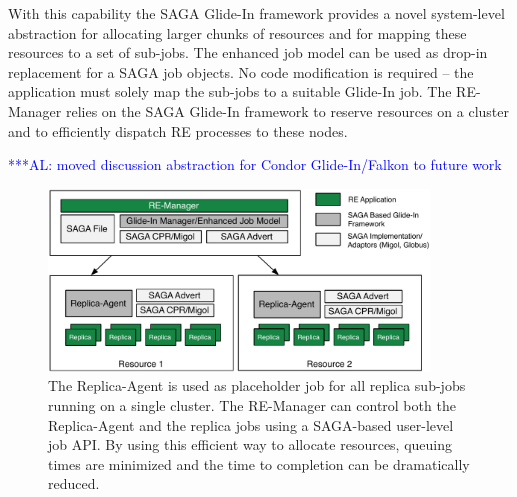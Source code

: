 \documentclass{rspublic}
\newcommand{\alnote}[1]{ {\textcolor{blue} { ***AL: #1 }}}
\newcommand{\alnote}[1]{}
\newcommand{\glidein}[1]{Glide-In }
\newcommand{\replicaagent}[1]{Replica-Agent }
\newcommand{\remanager}[1]{RE-Manager }
\begin{document}
With this capability the SAGA Glide-In framework provides a novel
system-level abstraction for allocating larger chunks of resources and
for mapping these resources to a set of sub-jobs. The enhanced job
model can be used as drop-in replacement for a SAGA job objects. No
code modification is required -- the application must solely map the
sub-jobs to a suitable Glide-In job.  The RE-Manager relies on the
SAGA Glide-In framework to reserve resources on a cluster and to
efficiently dispatch RE processes to these nodes.
                                         

\alnote{moved discussion abstraction for Condor Glide-In/Falkon to future work}



\begin{figure}[t]
    \centering
    \includegraphics[width=0.9\textwidth]{remdmanager_v11}
    \caption{\footnotesize The Replica-Agent is used as placeholder
      job for all replica sub-jobs running on a single cluster. The
      \remanager\ can control both the \replicaagent\ and the replica
      jobs using a SAGA-based user-level job API. By using this
      efficient way to allocate resources, queuing times are minimized
      and the time to completion can be dramatically reduced.}
    \label{fig:remdmanager_v1.1}
\end{figure}
\end{document}
